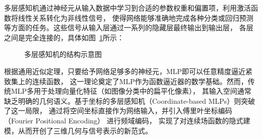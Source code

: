 多层感知机通过神经元从输入数据中学习到合适的参数权重和偏置项，利用激活函数将线性关系转化为非线性信号，
使得网络能够准确地完成各种分类或回归预测等方面的任务。这些信号从输入层通过一系列的隐藏层最终输出到输出层，
各层之间是完全连接的，具体如图~\ref{fig:mlp}所示：

\begin{figure}[htb]
  \centering
\caption{多层感知机的结构示意图}
\label{fig:mlp}
\end{figure}
根据通用近似定理\cite{Hornik_1989}，只要给予网络足够多的神经元，MLP即可以任意精度逼近紧致集上的连续函数，
这一理论奠定了MLP作为函数逼近器的数学基础。然而，传统MLP多用于处理向量化特征（如图像分类中的扁平化像素），
其输入空间通常缺乏明确的几何语义。基于坐标的多层感知机（Coordinate-based MLPs）则突破了这一局限，
通过将空间坐标直接作为网络输入，并引入傅里叶坐标编码（Fourier Positional Encoding）
进行频域编码\cite{tancik2020fourier}，
实现了对连续场函数的隐式建模，从而开创了三维几何与信号表示的新范式。

